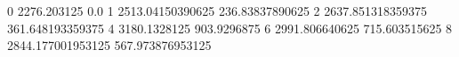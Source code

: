 0 2276.203125 0.0
1 2513.04150390625 236.83837890625
2 2637.851318359375 361.648193359375
4 3180.1328125 903.9296875
6 2991.806640625 715.603515625
8 2844.177001953125 567.973876953125
